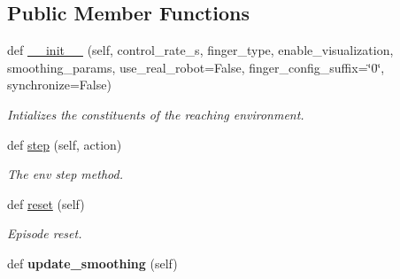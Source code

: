 \subsection*{Public Member Functions}
\begin{DoxyCompactItemize}
\item 
def \hyperlink{classtrifinger__simulation_1_1gym__wrapper_1_1envs_1_1trifinger__reach_1_1TriFingerReach_afa5e38aa9079d1b271d291e3d197f423}{\+\_\+\+\_\+init\+\_\+\+\_\+} (self, control\+\_\+rate\+\_\+s, finger\+\_\+type, enable\+\_\+visualization, smoothing\+\_\+params, use\+\_\+real\+\_\+robot=False, finger\+\_\+config\+\_\+suffix=\char`\"{}0\char`\"{}, synchronize=False)
\begin{DoxyCompactList}\small\item\em Intializes the constituents of the reaching environment. \end{DoxyCompactList}\item 
def \hyperlink{classtrifinger__simulation_1_1gym__wrapper_1_1envs_1_1trifinger__reach_1_1TriFingerReach_a949ff008d719543f6146d276698bd9f1}{step} (self, action)
\begin{DoxyCompactList}\small\item\em The env step method. \end{DoxyCompactList}\item 
def \hyperlink{classtrifinger__simulation_1_1gym__wrapper_1_1envs_1_1trifinger__reach_1_1TriFingerReach_a46ae0ba9d5fc6cf4b8809db2fce2502b}{reset} (self)
\begin{DoxyCompactList}\small\item\em Episode reset. \end{DoxyCompactList}\item 
\mbox{\label{classtrifinger__simulation_1_1gym__wrapper_1_1envs_1_1trifinger__reach_1_1TriFingerReach_ab09049dd0356e3c89a3145affbe9dcc7}} 
def {\bfseries update\+\_\+smoothing} (self)
\end{DoxyCompactItemize}
